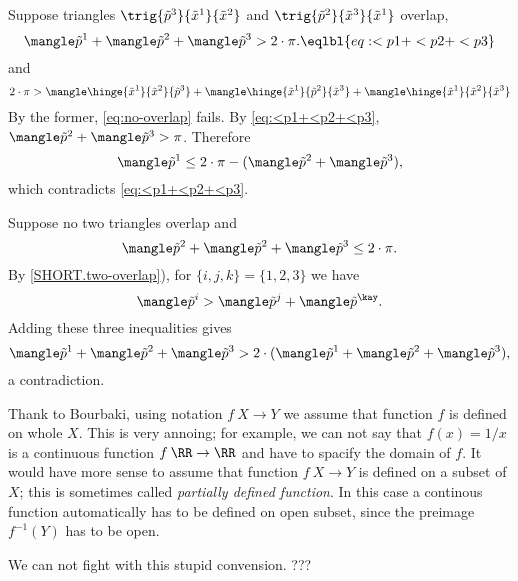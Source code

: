 


Suppose triangles $\trig{\tilde p^3}{\tilde x^1}{\tilde x^2}$ and $\trig{\tilde p^2}{\tilde x^3}{\tilde x^1}$ overlap, 
\[\mangle\tilde p^1 + \mangle\tilde p^2+\mangle\tilde p^3 > 2\cdot\pi.
\eqlbl{eq:<p1+<p2+<p3}\]
and
\[
2\cdot\pi>\mangle\hinge {\tilde x^1}{\tilde x^2}{\tilde p^3}+\mangle\hinge {\tilde x^1}{\tilde p^2}{\tilde x^3}+\mangle\hinge {\tilde x^1}{\tilde x^2}{\tilde x^3}\]
By the former, \ref{eq:no-overlap} fails.  
By \ref{eq:<p1+<p2+<p3}, $\mangle\tilde p^2+\mangle\tilde p^3 > \pi$. 
Therefore
\[\mangle\tilde p^1
\le 
2\cdot\pi -(\mangle\tilde p^2+\mangle\tilde p^3),\]
which contradicts \ref{eq:<p1+<p2+<p3}.

Suppose no two triangles overlap and 
\[\mangle\tilde p^2 + \mangle\tilde p^2+\mangle\tilde p^3 \le 2\cdot\pi.\]  
By \ref{SHORT.two-overlap}), for $\{i,j,k\}=\{1,2,3\}$ we have
\[\mangle\tilde p^i > \mangle\tilde p^j+\mangle\tilde p^\kay.\]
Adding these three inequalities gives
\[ \mangle\tilde p^1+\mangle\tilde p^2+\mangle\tilde p^3 > 2\cdot (\mangle\tilde p^1+\mangle\tilde p^2+\mangle\tilde p^3),\] 
a contradiction.














Thank to Bourbaki, using notation $f\:X\to Y$
we assume that function $f$ is defined on whole $X$.
This is very annoing;
for example, we can not say that $f(x)=1/x$ is a continuous function $f\:\RR\to\RR$ and have to spacify the domain of $f$.
It would have more sense to assume that function $f\:X\to Y$ is defined on a subset of $X$;
this is sometimes called \emph{partially defined function}.
In this case a continous function automatically has to be defined on open subset, since the preimage $f^{-1}(Y)$ has to be open.

We can not fight with this stupid convension.
???













